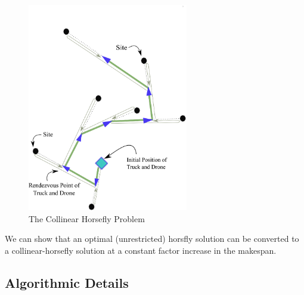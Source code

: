 \documentclass[11.5pt]{report}
\begin{document}
\begin{figure}[H]
\centering
    \includegraphics[width=7cm]{../webs/docs/collinear_horseflies.eps}
    \caption{The Collinear Horsefly Problem}
    \label{fig:collinear-horseflies}
\end{figure}

We can show that an optimal (unrestricted) horsfly solution can be converted
to a collinear-horsefly solution at a constant factor increase in the makespan. 

\subsection{Algorithmic Details}
\end{document}
